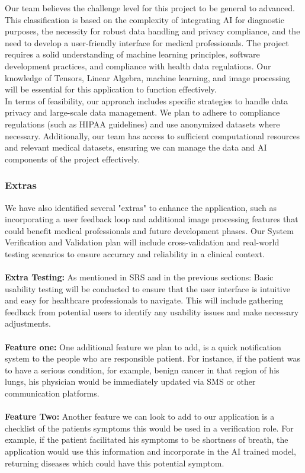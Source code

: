 \documentclass[12pt, titlepage]{article}
\begin{document}
Our team believes the challenge level for this project to be general to advanced. This classification is based on the complexity of integrating AI for diagnostic purposes, the necessity for robust data handling and privacy compliance, and the need to develop a user-friendly interface for medical professionals. The project requires a solid understanding of machine learning principles, software development practices, and compliance with health data regulations. Our knowledge of Tensors, Linear Algebra, machine learning, and image processing will be essential for this application to function effectively. \\
In terms of feasibility, our approach includes specific strategies to handle data privacy and large-scale data management. We plan to adhere to compliance regulations (such as HIPAA guidelines) and use anonymized datasets where necessary. Additionally, our team has access to sufficient computational resources and relevant medical datasets, ensuring we can manage the data and AI components of the project effectively. \\

\subsubsection{Extras}
We have also identified several "extras" to enhance the application, such as incorporating a user feedback loop and additional image processing features that could benefit medical professionals and future development phases. Our System Verification and Validation plan will include cross-validation and real-world testing scenarios to ensure accuracy and reliability in a clinical context. \\\\
\textbf{Extra Testing:}
As mentioned in SRS and in the previous sections: Basic usability testing will be conducted to ensure that the user interface is intuitive and easy for healthcare professionals to navigate. This will include gathering feedback from potential users to identify any usability issues and make necessary adjustments. \\\\  
\textbf{Feature one:}
One additional feature we plan to add, is a quick notification system to the people who are responsible patient. For instance, if the patient was to have a serious condition, for example, benign cancer in that region of his lungs, his physician would be immediately updated via SMS or other communication platforms. \\\\  
\textbf{Feature Two:}
Another feature we can look to add to our application is a checklist of the patients symptoms this would be used in a verification role. For example, if the patient facilitated his symptoms to be shortness of breath, the application would use this information and incorporate in the AI trained model, returning diseases which could have this potential symptom.\\  
\end{document}
